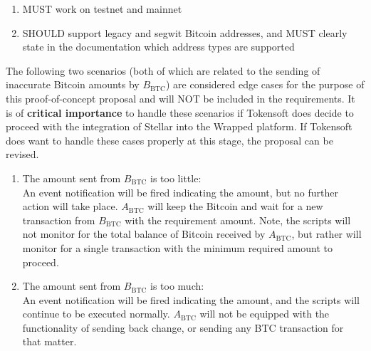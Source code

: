 \begin{enumerate}[noitemsep]
  \item MUST work on testnet and mainnet

  \item SHOULD support legacy and segwit Bitcoin addresses, and MUST clearly state in the documentation which address types are supported

\end{enumerate}

\noindent
The following two scenarios (both of which are related to the sending of inaccurate Bitcoin amounts by $B_\mathrm{BTC}$) are considered edge cases for the purpose of this proof-of-concept proposal and will NOT be included in the requirements.
It is of \textbf{critical importance} to handle these scenarios if Tokensoft does decide to proceed with the integration of Stellar into the Wrapped platform.
If Tokensoft does want to handle these cases properly at this stage, the proposal can be revised.

\begin{enumerate}[noitemsep]
  \item The amount sent from $B_\mathrm{BTC}$ is too little:\\
  An event notification will be fired indicating the amount, but no further action will take place.
  $A_\mathrm{BTC}$ will keep the Bitcoin and wait for a new transaction from $B_\mathrm{BTC}$ with the requirement amount.
  Note, the scripts will not monitor for the total balance of Bitcoin received by $A_\mathrm{BTC}$, but rather will monitor for a single transaction with the minimum required amount to proceed.

  \item The amount sent from $B_\mathrm{BTC}$ is too much:\\
  An event notification will be fired indicating the amount, and the scripts will continue to be executed normally. 
  $A_\mathrm{BTC}$ will not be equipped with the functionality of sending back change, or sending any BTC transaction for that matter. 
\end{enumerate}
